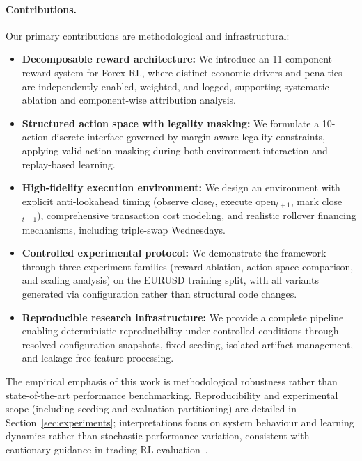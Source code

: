 \paragraph{Contributions.}
Our primary contributions are methodological and infrastructural:
\begin{itemize}[leftmargin=1.4em]
    \item \textbf{Decomposable reward architecture:} We introduce an 11-component reward system for Forex RL, where distinct economic drivers and penalties are independently enabled, weighted, and logged, supporting systematic ablation and component-wise attribution analysis.
    \item \textbf{Structured action space with legality masking:} We formulate a 10-action discrete interface governed by margin-aware legality constraints, applying valid-action masking during both environment interaction and replay-based learning.
    \item \textbf{High-fidelity execution environment:} We design an environment with explicit anti-lookahead timing (observe close$_t$, execute open$_{t+1}$, mark close$_{t+1}$), comprehensive transaction cost modeling, and realistic rollover financing mechanisms, including triple-swap Wednesdays.
    \item \textbf{Controlled experimental protocol:} We demonstrate the framework through three experiment families (reward ablation, action-space comparison, and scaling analysis) on the EURUSD training split, with all variants generated via configuration rather than structural code changes.
    \item \textbf{Reproducible research infrastructure:} We provide a complete pipeline enabling deterministic reproducibility under controlled conditions through resolved configuration snapshots, fixed seeding, isolated artifact management, and leakage-free feature processing.
\end{itemize}

The empirical emphasis of this work is methodological robustness rather than state-of-the-art performance benchmarking. Reproducibility and experimental scope (including seeding and evaluation partitioning) are detailed in Section~\ref{sec:experiments}; interpretations focus on system behaviour and learning dynamics rather than stochastic performance variation, consistent with cautionary guidance in trading-RL evaluation~\citep{zhang2020deep}.

